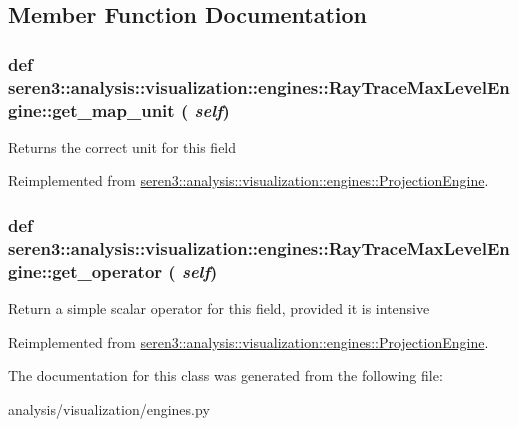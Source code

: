\subsection{Member Function Documentation}
\hypertarget{classseren3_1_1analysis_1_1visualization_1_1engines_1_1RayTraceMaxLevelEngine_ae614bc68c2ab9d2a68e8392175fc19e2}{
\subsubsection[{get\_\-map\_\-unit}]{\setlength{\rightskip}{0pt plus 5cm}def seren3::analysis::visualization::engines::RayTraceMaxLevelEngine::get\_\-map\_\-unit ( {\em self})}}
\label{classseren3_1_1analysis_1_1visualization_1_1engines_1_1RayTraceMaxLevelEngine_ae614bc68c2ab9d2a68e8392175fc19e2}
\begin{DoxyVerb}
Returns the correct unit for this field
\end{DoxyVerb}
 

Reimplemented from \hyperlink{classseren3_1_1analysis_1_1visualization_1_1engines_1_1ProjectionEngine_a2009db840c6f340e3c39d21dc81a3b77}{seren3::analysis::visualization::engines::ProjectionEngine}.\hypertarget{classseren3_1_1analysis_1_1visualization_1_1engines_1_1RayTraceMaxLevelEngine_a18ccb6602ed9e6ba18cbff8de2e6ad8c}{
\subsubsection[{get\_\-operator}]{\setlength{\rightskip}{0pt plus 5cm}def seren3::analysis::visualization::engines::RayTraceMaxLevelEngine::get\_\-operator ( {\em self})}}
\label{classseren3_1_1analysis_1_1visualization_1_1engines_1_1RayTraceMaxLevelEngine_a18ccb6602ed9e6ba18cbff8de2e6ad8c}
\begin{DoxyVerb}
Return a simple scalar operator for this field, provided it is intensive
\end{DoxyVerb}
 

Reimplemented from \hyperlink{classseren3_1_1analysis_1_1visualization_1_1engines_1_1ProjectionEngine_a42f12a0ccc166799a59549d9fe672f2b}{seren3::analysis::visualization::engines::ProjectionEngine}.

The documentation for this class was generated from the following file:\begin{DoxyCompactItemize}
\item 
analysis/visualization/engines.py\end{DoxyCompactItemize}
